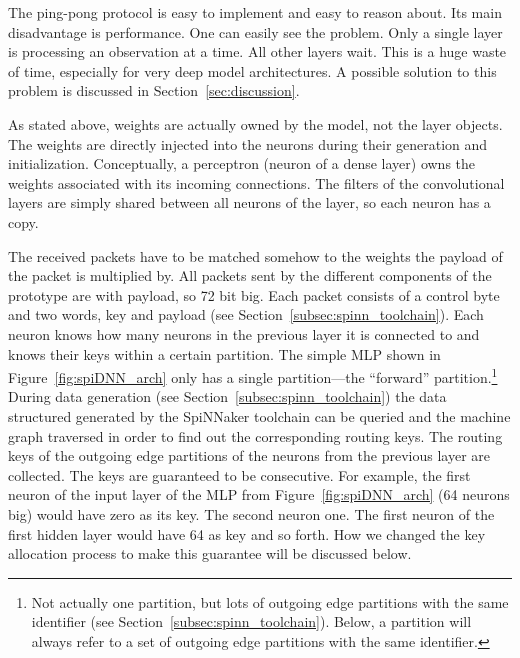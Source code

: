 \documentclass[]{article}
\begin{document}
The ping-pong protocol is easy to implement and easy to reason about.
Its main disadvantage is performance.
One can easily see the problem.
Only a single layer is processing an observation at a time.
All other layers wait.
This is a huge waste of time, especially for very deep model
architectures.
A possible solution to this problem is discussed in
Section~\ref{sec:discussion}.

As stated above, weights are actually owned by the model, not
the layer objects.
The weights are directly injected into the neurons during their
generation and initialization.
Conceptually, a perceptron (neuron of a dense layer) owns the weights
associated with its incoming connections.
The filters of the convolutional layers are simply shared between
all neurons of the layer, so each neuron has a copy.

The received packets have to be matched somehow to the weights
the payload of the packet is multiplied by.
All packets sent by the different components of the prototype are
with payload, so 72 bit big.
Each packet consists of a control byte and two words, key and payload
(see Section~\ref{subsec:spinn_toolchain}).
Each neuron knows how many neurons in the previous layer it is
connected to and knows their keys within a certain partition.
The simple MLP shown in Figure~\ref{fig:spiDNN_arch} only has a
single partition---the ``forward'' partition.\footnote{%
  Not actually one
  partition, but lots of outgoing edge partitions with the same
  identifier (see Section~\ref{subsec:spinn_toolchain}).
  Below, a partition will always refer to a set of outgoing edge
  partitions with the same identifier.}
During data generation (see Section~\ref{subsec:spinn_toolchain})
the data structured generated by the SpiNNaker toolchain can be
queried and the machine graph traversed in order to find out the
corresponding routing keys.
The routing keys of the outgoing edge partitions of the neurons
from the previous layer are collected.
The keys are guaranteed to be consecutive.
For example, the first neuron of the input layer of the MLP from
Figure~\ref{fig:spiDNN_arch} (64 neurons big) would have zero as its
key.
The second neuron one.
The first neuron of the first hidden layer would have 64 as key and so
forth.
How we changed the key allocation process to make this guarantee will
be discussed below.
\end{document}
